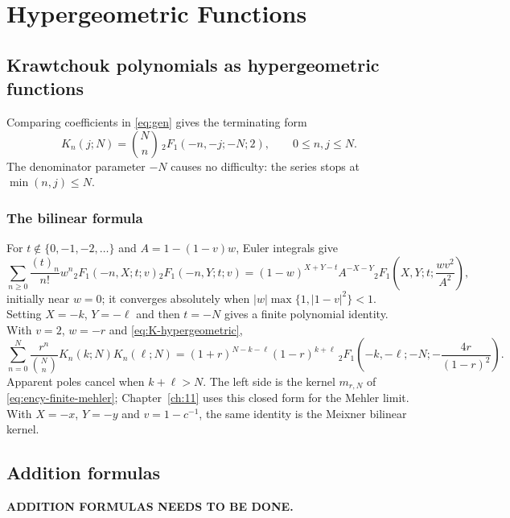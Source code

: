 \chapter{Hypergeometric Functions}
\label{ch:15}
\section{Krawtchouk polynomials as hypergeometric functions}
\label{sec:15-1}
Comparing coefficients in \eqref{eq:gen} gives the terminating form
\begin{equation}\label{eq:K-hypergeometric}
K_n(j;N)=\binom Nn\,{}_2F_1\!\left(-n,-j;-N;2\right),\qquad 0\le n,j\le N.
\end{equation}
The denominator parameter $-N$ causes no difficulty: the series stops at
$\min(n,j)\le N$.

\subsection{The bilinear formula}
For $t\notin\{0,-1,-2,\ldots\}$ and $A=1-(1-v)w$, Euler integrals give
\[
\sum_{n\ge0}\frac{(t)_n}{n!}w^n
{}_2F_1(-n,X;t;v){}_2F_1(-n,Y;t;v)
=(1-w)^{X+Y-t}A^{-X-Y}{}_2F_1\!\left(X,Y;t;\frac{wv^2}{A^2}\right),
\]
initially near $w=0$; it converges absolutely when
$|w|\max\{1,|1-v|^2\}<1$. Setting $X=-k$, $Y=-\ell$ and then $t=-N$
gives a finite polynomial identity. With $v=2$, $w=-r$ and
\eqref{eq:K-hypergeometric},
\begin{equation}\label{eq:closed-bilinear}
\sum_{n=0}^N\frac{r^n}{\binom Nn}K_n(k;N)K_n(\ell;N)
=(1+r)^{N-k-\ell}(1-r)^{k+\ell}\,
{}_2F_1\!\left(-k,-\ell;-N;-\frac{4r}{(1-r)^2}\right).
\end{equation}
Apparent poles cancel when $k+\ell>N$. The left side is the kernel
$m_{r,N}$ of \eqref{eq:ency-finite-mehler}; Chapter~\ref{ch:11} uses this
closed form for the Mehler limit. With $X=-x$, $Y=-y$ and $v=1-c^{-1}$,
the same identity is the Meixner bilinear kernel.

\section{Addition formulas}
\label{sec:15-2}

\noindent\textbf{ADDITION FORMULAS NEEDS TO BE DONE.}


